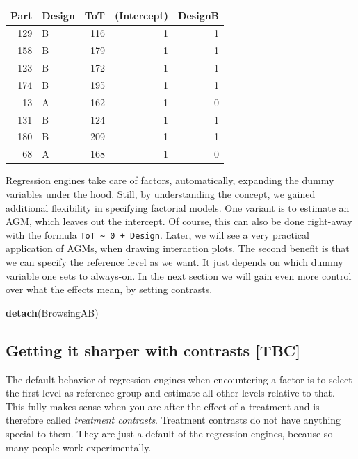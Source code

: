 \documentclass[]{svmono}
\newenvironment{Shaded}{\begin{snugshade}}{\end{snugshade}}
\newcommand{\KeywordTok}[1]{\textcolor[rgb]{0.13,0.29,0.53}{\textbf{#1}}}
\newcommand{\NormalTok}[1]{#1}
\theoremstyle{definition}
\theoremstyle{definition}
\theoremstyle{definition}
\theoremstyle{remark}
\begin{document}
\begin{tabular}{r|l|r|r|r}
\hline
Part & Design & ToT & (Intercept) & DesignB\\
\hline
129 & B & 116 & 1 & 1\\
\hline
158 & B & 179 & 1 & 1\\
\hline
123 & B & 172 & 1 & 1\\
\hline
174 & B & 195 & 1 & 1\\
\hline
13 & A & 162 & 1 & 0\\
\hline
131 & B & 124 & 1 & 1\\
\hline
180 & B & 209 & 1 & 1\\
\hline
68 & A & 168 & 1 & 0\\
\hline
\end{tabular}

Regression engines take care of factors, automatically, expanding the
dummy variables under the hood. Still, by understanding the concept, we
gained additional flexibility in specifying factorial models. One
variant is to estimate an AGM, which leaves out the intercept. Of
course, this can also be done right-away with the formula
\texttt{ToT\ \textasciitilde{}\ 0\ +\ Design}. Later, we will see a very
practical application of AGMs, when drawing interaction plots. The
second benefit is that we can specify the reference level as we want. It
just depends on which dummy variable one sets to always-on. In the next
section we will gain even more control over what the effects mean, by
setting contrasts.

\begin{Shaded}
\begin{Highlighting}[]
\KeywordTok{detach}\NormalTok{(BrowsingAB)}
\end{Highlighting}
\end{Shaded}

\subsection{Getting it sharper with contrasts
{[}TBC{]}}\label{contrasts}

The default behavior of regression engines when encountering a factor is
to select the first level as reference group and estimate all other
levels relative to that. This fully makes sense when you are after the
effect of a treatment and is therefore called \emph{treatment
contrasts}. Treatment contrasts do not have anything special to them.
They are just a default of the regression engines, because so many
people work experimentally.
\end{document}
